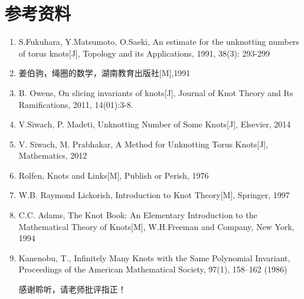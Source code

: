 \documentclass[bigger]{beamer}
\begin{document}
\section{参考资料}
\label{sec:org3aefbf4}
\begin{enumerate}
\item\relax [1] S.Fukuhara, Y.Matsumoto, O.Saeki, An estimate for the unknotting numbers of torus knots[J], Topology and its Applications, 1991, 38(3): 293-299
\label{sec:orgf029980}
\item\relax [2] 姜伯驹，绳圈的数学，湖南教育出版社[M],1991
\label{sec:org5eb5f93}
\item\relax [3] B. Owens, On slicing invariants of knots[J], Journal of Knot Theory and Its Ramifications, 2011, 14(01):3-8.
\label{sec:orgec3762f}
\item\relax [4] V.Siwach, P. Madeti, Unknotting Number of Some Knots[J], Elsevier, 2014
\label{sec:org2861f9b}
\item\relax [5] V. Siwach, M. Prabhakar, A Method for Unknotting Torus Knots[J], Mathematics, 2012
\label{sec:org662bd3a}
\item\relax [6] Rolfen, Knots and Links[M], Publish or Perish, 1976
\label{sec:org9401f1c}
\item\relax [7] W.B. Raymond Lickorish, Introduction to Knot Theory[M], Springer, 1997
\label{sec:org203d55d}
\item\relax [8] C.C. Adams, The Knot Book: An Elementary Introduction to the Mathematical Theory of Knots[M], W.H.Freeman and Company, New York, 1994
\label{sec:orgb77a548}
\item\relax [9] Kanenobu, T., Infinitely Many Knots with the Same Polynomial Invariant, Proceedings of the American Mathematical Society, 97(1), 158–162 (1986)
\label{sec:org4d1b44a}

感谢聆听，请老师批评指正！
\end{enumerate}
\end{document}
